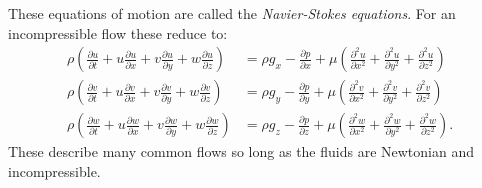 These equations of motion are called the \textit{Navier-Stokes equations}. For an incompressible flow these reduce to:
\begin{align*}
  \rho \left( \frac{\partial u}{\partial t} + u \frac{\partial u}{\partial x} + v \frac{\partial u}{\partial y} + w \frac{\partial u}{\partial z}  \right) &= \rho g_x - \frac{\partial p}{\partial x} + \mu \left( \frac{\partial^2 u}{\partial x^2} + \frac{\partial^2 u}{\partial y^2} + \frac{\partial^2 u}{\partial z^2} \right) \\
  \rho \left( \frac{\partial v}{\partial t} + u \frac{\partial v}{\partial x} + v \frac{\partial v}{\partial y} + w \frac{\partial v}{\partial z}  \right) &= \rho g_y - \frac{\partial p}{\partial y} + \mu \left( \frac{\partial^2 v}{\partial x^2} + \frac{\partial^2 v}{\partial y^2} + \frac{\partial^2 v}{\partial z^2} \right) \\
  \rho \left( \frac{\partial w}{\partial t} + u \frac{\partial w}{\partial x} + v \frac{\partial w}{\partial y} + w \frac{\partial w}{\partial z}  \right) &= \rho g_z - \frac{\partial p}{\partial z} + \mu \left( \frac{\partial^2 w}{\partial x^2} + \frac{\partial^2 w}{\partial y^2} + \frac{\partial^2 w}{\partial z^2} \right)
.\end{align*}
These describe many common flows so long as the fluids are Newtonian and incompressible. 
